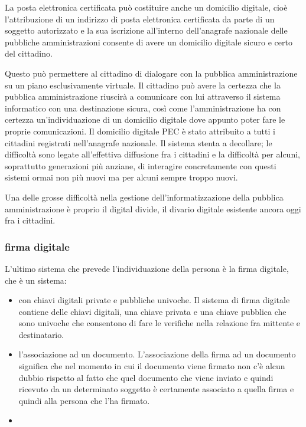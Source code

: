 La posta elettronica certificata può costituire anche un domicilio digitale, cioè l'attribuzione di un indirizzo di posta elettronica certificata da parte di un soggetto autorizzato e la sua iscrizione all'interno dell'anagrafe nazionale delle pubbliche amministrazioni consente di avere un domicilio digitale sicuro e certo del cittadino.

Questo può permettere al cittadino di dialogare con la pubblica amministrazione su un piano esclusivamente virtuale. Il cittadino può avere la certezza che la pubblica amministrazione riuscirà a comunicare con lui attraverso il sistema informatico con una destinazione sicura, così come l'amministrazione ha con certezza un'individuazione di un domicilio digitale dove appunto poter fare le proprie comunicazioni.
Il domicilio digitale PEC è stato attribuito a tutti i cittadini registrati nell'anagrafe nazionale. Il sistema stenta a decollare; 
le difficoltà sono legate all'effettiva diffusione fra i cittadini e la difficoltà per alcuni, soprattutto generazioni più anziane, di interagire concretamente con questi sistemi ormai non più nuovi ma per alcuni sempre troppo nuovi.

Una delle grosse difficoltà nella gestione dell'informatizzazione della pubblica amministrazione è proprio il digital divide, il divario digitale esistente  ancora oggi fra i cittadini.

\subsubsection{firma digitale}

L'ultimo sistema che prevede l'individuazione della persona è la firma digitale, che è un sistema:
\begin{itemize}
    \item con chiavi digitali private e pubbliche univoche. Il sistema di firma digitale contiene delle chiavi digitali, una chiave privata e una chiave pubblica che sono univoche che consentono  di fare le verifiche nella relazione fra mittente e destinatario. 
    \item l'associazione ad un documento. L'associazione della firma ad un documento significa che nel momento in cui il documento viene firmato non c'è alcun dubbio rispetto al fatto che quel documento che viene inviato e quindi ricevuto da un determinato soggetto è certamente associato a quella firma e quindi alla persona che l'ha firmato. 
    \item 
\end{itemize}

